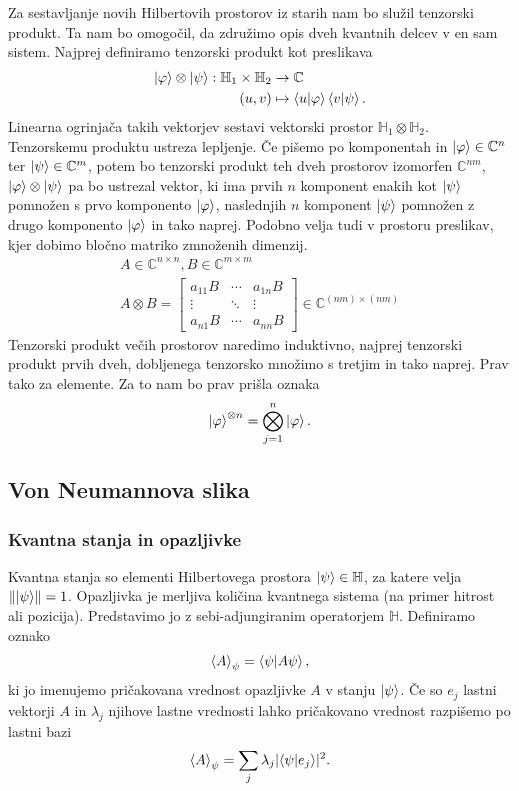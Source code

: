 \documentclass[mat1]{fmfdelo}
\newcommand{\C}{\mathbb C}
\newcommand{\Hb}{\mathbb H}
\begin{document}
Za sestavljanje novih Hilbertovih prostorov iz starih nam bo služil tenzorski produkt. Ta nam bo omogočil, da združimo opis dveh kvantnih delcev v en sam sistem. Najprej definiramo tenzorski produkt kot preslikava
\begin{align*}
    \ket\varphi \otimes \ket\psi : \Hb_1 \times \Hb_2 &\to \mathbb C\\
    (u,v) &\mapsto \braket{u}{\varphi} \braket{v}{\psi}.
\end{align*}
Linearna ogrinjača takih vektorjev sestavi vektorski prostor \(\Hb_1 \otimes \Hb_2\). Tenzorskemu produktu ustreza lepljenje. Če pišemo po komponentah in \(\ket\varphi\in\C^n\) ter \(\ket\psi\in\C^m\), potem bo tenzorski produkt teh dveh prostorov izomorfen \(\C^{nm}\), \(\ket\varphi\otimes\ket\psi\) pa bo ustrezal vektor, ki ima prvih \(n\) komponent enakih kot \(\ket\psi\) pomnožen s prvo komponento \(\ket\varphi\), naslednjih \(n\) komponent \(\ket\psi\) pomnožen z drugo komponento \(\ket\varphi\) in tako naprej. Podobno velja tudi v prostoru preslikav, kjer dobimo bločno matriko zmnoženih dimenzij.
\begin{align*}
    A\in \C^{n\times n}, B\in\C^{m\times m}\\
    A\otimes B = \begin{bmatrix}
        a_{11}B&\cdots&a_{1n}B\\
        \vdots&\ddots&\vdots\\
        a_{n1}B&\cdots&a_{nn}B
    \end{bmatrix}\in \C^{(nm)\times (nm)}
\end{align*}
Tenzorski produkt večih prostorov naredimo induktivno, najprej tenzorski produkt prvih dveh, dobljenega tenzorsko množimo s tretjim in tako naprej. Prav tako za elemente. Za to nam bo prav prišla oznaka
\begin{align*}
    \ket{\varphi}^{\otimes n} = \bigotimes_{j=1}^n \ket\varphi.
\end{align*}

\subsection{Von Neumannova slika}
\subsubsection{Kvantna stanja in opazljivke}
Kvantna stanja so elementi Hilbertovega prostora \(\ket\psi\in\Hb\), za katere velja \(\norm{\ket\psi} = 1\). Opazljivka je merljiva količina kvantnega sistema (na primer hitrost ali pozicija). Predstavimo jo z sebi-adjungiranim operatorjem \(\Hb\). Definiramo oznako
\begin{align*}
    \ev{A}_\psi = \braket{\psi}{A\psi},
\end{align*}
ki jo imenujemo pričakovana vrednost opazljivke \(A\) v stanju \(\ket\psi\). Če so \(e_j\) lastni vektorji \(A\) in \(\lambda_j\) njihove lastne vrednosti lahko pričakovano vrednost razpišemo po lastni bazi
\begin{align*}
    \ev{A}_\psi = \sum_j\lambda_j\lvert \braket{\psi}{e_j}\rvert^2.
\end{align*}
\end{document}
